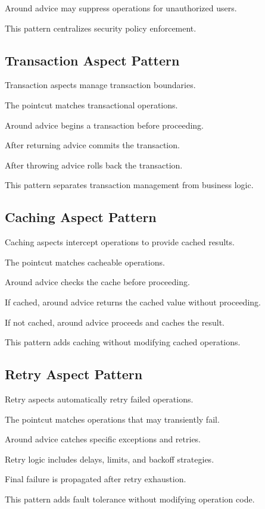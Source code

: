 \documentclass[11pt]{article}
\begin{document}
Around advice may suppress operations for unauthorized users.

This pattern centralizes security policy enforcement.

\subsection{Transaction Aspect Pattern}

Transaction aspects manage transaction boundaries.

The pointcut matches transactional operations.

Around advice begins a transaction before proceeding.

After returning advice commits the transaction.

After throwing advice rolls back the transaction.

This pattern separates transaction management from business logic.

\subsection{Caching Aspect Pattern}

Caching aspects intercept operations to provide cached results.

The pointcut matches cacheable operations.

Around advice checks the cache before proceeding.

If cached, around advice returns the cached value without proceeding.

If not cached, around advice proceeds and caches the result.

This pattern adds caching without modifying cached operations.

\subsection{Retry Aspect Pattern}

Retry aspects automatically retry failed operations.

The pointcut matches operations that may transiently fail.

Around advice catches specific exceptions and retries.

Retry logic includes delays, limits, and backoff strategies.

Final failure is propagated after retry exhaustion.

This pattern adds fault tolerance without modifying operation code.
\end{document}
